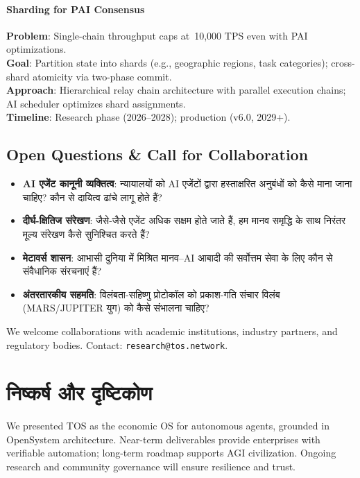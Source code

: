 \documentclass[11pt]{article}
\begin{document}
\begin{itemize}[noitemsep]
\begin{itemize}[noitemsep]
\begin{itemize}[noitemsep]
\begin{itemize}[noitemsep]
\begin{itemize}[noitemsep]
\begin{itemize}[noitemsep]
\paragraph{Sharding for PAI Consensus}
\textbf{Problem}: Single-chain throughput caps at~10,000 TPS even with PAI optimizations.\\
\textbf{Goal}: Partition state into shards (e.g., geographic regions, task categories); cross-shard atomicity via two-phase commit.\\
\textbf{Approach}: Hierarchical relay chain architecture with parallel execution chains; AI scheduler optimizes shard assignments.\\
\textbf{Timeline}: Research phase (2026--2028); production (v6.0, 2029+).

\subsection{Open Questions \& Call for Collaboration}

\begin{itemize}[noitemsep]
  \item \textbf{AI एजेंट कानूनी व्यक्तित्व}: न्यायालयों को AI एजेंटों द्वारा हस्ताक्षरित अनुबंधों को कैसे माना जाना चाहिए? कौन से दायित्व ढांचे लागू होते हैं?
  \item \textbf{दीर्घ-क्षितिज संरेखण}: जैसे-जैसे एजेंट अधिक सक्षम होते जाते हैं, हम मानव समृद्धि के साथ निरंतर मूल्य संरेखण कैसे सुनिश्चित करते हैं?
  \item \textbf{मेटावर्स शासन}: आभासी दुनिया में मिश्रित मानव--AI आबादी की सर्वोत्तम सेवा के लिए कौन से संवैधानिक संरचनाएं हैं?
  \item \textbf{अंतरतारकीय सहमति}: विलंबता-सहिष्णु प्रोटोकॉल को प्रकाश-गति संचार विलंब (MARS/JUPITER युग) को कैसे संभालना चाहिए?
\end{itemize}

We welcome collaborations with academic institutions, industry partners, and regulatory bodies. Contact: \texttt{research@tos.network}.

\section{निष्कर्ष और दृष्टिकोण}
We presented TOS as the economic OS for autonomous agents, grounded in OpenSystem architecture. Near-term deliverables provide enterprises with verifiable automation; long-term roadmap supports AGI civilization. Ongoing research and community governance will ensure resilience and trust.


\end{itemize}
\end{itemize}
\end{itemize}
\end{itemize}
\end{itemize}
\end{itemize}
\end{document}
